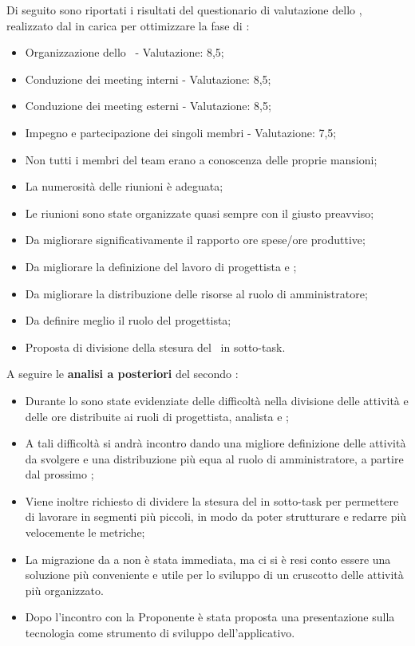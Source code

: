 \par Di seguito sono riportati i risultati del questionario di valutazione dello , realizzato dal \Responsabile{} in carica per ottimizzare la fase di :
\begin{itemize}
  \item Organizzazione dello \ - Valutazione: 8,5;
  \item Conduzione dei meeting interni - Valutazione: 8,5;
  \item Conduzione dei meeting esterni - Valutazione: 8,5;
  \item Impegno e partecipazione dei singoli membri - Valutazione: 7,5;
  \item Non tutti i membri del team erano a conoscenza delle proprie mansioni;
  \item La numerosità delle riunioni è adeguata;
  \item Le riunioni sono state organizzate quasi sempre con il giusto preavviso;
  \item Da migliorare significativamente il rapporto ore spese/ore produttive;
  \item Da migliorare la definizione del lavoro di progettista e \Programmatore{};
  \item Da migliorare la distribuzione delle risorse al ruolo di amministratore;
  \item Da definire meglio il ruolo del progettista;
  \item Proposta di divisione della stesura del \PdQ\ in sotto-task.
\end{itemize}

\vspace{0.5\baselineskip}
\par A seguire le \textbf{analisi a posteriori} del secondo :
\begin{itemize}
  \item Durante lo  sono state evidenziate delle difficoltà nella divisione delle attività e delle ore distribuite ai ruoli di progettista, analista e \Programmatore{};
  \item A tali difficoltà si andrà incontro dando una migliore definizione delle attività da svolgere e una distribuzione più equa al ruolo di amministratore, a partire dal prossimo ;
  \item Viene inoltre richiesto di dividere la stesura del \PdQ in sotto-task per permettere di lavorare in segmenti più piccoli, in modo da poter strutturare e redarre più velocemente le metriche;
  \item La migrazione da  a  non è stata immediata, ma ci si è resi conto essere una soluzione più conveniente e utile per lo sviluppo di un cruscotto delle attività più organizzato.
  \item Dopo l'incontro con la Proponente è stata proposta una presentazione sulla tecnologia  come strumento di sviluppo dell'applicativo.
\end{itemize}

